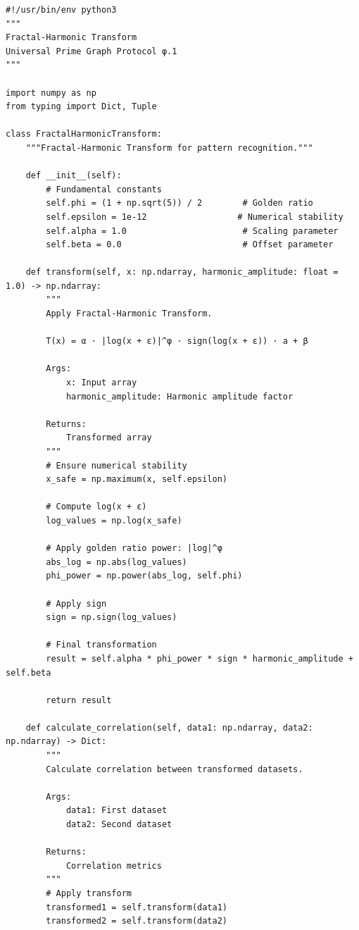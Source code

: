 \begin{lstlisting}[caption={Fractal-Harmonic Transform Implementation},label={code:fractal_harmonic}]
#!/usr/bin/env python3
"""
Fractal-Harmonic Transform
Universal Prime Graph Protocol φ.1
"""

import numpy as np
from typing import Dict, Tuple

class FractalHarmonicTransform:
    """Fractal-Harmonic Transform for pattern recognition."""
    
    def __init__(self):
        # Fundamental constants
        self.phi = (1 + np.sqrt(5)) / 2        # Golden ratio
        self.epsilon = 1e-12                  # Numerical stability
        self.alpha = 1.0                       # Scaling parameter
        self.beta = 0.0                        # Offset parameter
    
    def transform(self, x: np.ndarray, harmonic_amplitude: float = 1.0) -> np.ndarray:
        """
        Apply Fractal-Harmonic Transform.
        
        T(x) = α · |log(x + ε)|^φ · sign(log(x + ε)) · a + β
        
        Args:
            x: Input array
            harmonic_amplitude: Harmonic amplitude factor
        
        Returns:
            Transformed array
        """
        # Ensure numerical stability
        x_safe = np.maximum(x, self.epsilon)
        
        # Compute log(x + ε)
        log_values = np.log(x_safe)
        
        # Apply golden ratio power: |log|^φ
        abs_log = np.abs(log_values)
        phi_power = np.power(abs_log, self.phi)
        
        # Apply sign
        sign = np.sign(log_values)
        
        # Final transformation
        result = self.alpha * phi_power * sign * harmonic_amplitude + self.beta
        
        return result
    
    def calculate_correlation(self, data1: np.ndarray, data2: np.ndarray) -> Dict:
        """
        Calculate correlation between transformed datasets.
        
        Args:
            data1: First dataset
            data2: Second dataset
        
        Returns:
            Correlation metrics
        """
        # Apply transform
        transformed1 = self.transform(data1)
        transformed2 = self.transform(data2)
        

\end{lstlisting}
